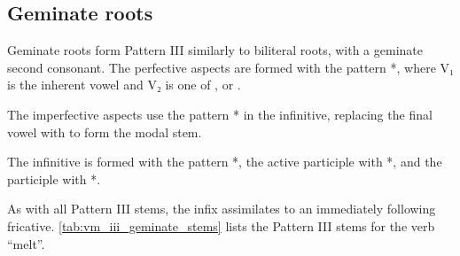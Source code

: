 \documentclass[grammar]{subfiles}
\begin{document}
\subsection{Geminate roots}
\label{ssec:vm_iii_geminate_roots}

Geminate roots form Pattern III similarly to biliteral roots, with a geminate
second consonant.  The perfective aspects are formed with the pattern
*, where V₁ is the inherent vowel and V₂ is one of ,
 or .  

The imperfective aspects use the pattern * in the
infinitive, replacing the final vowel with  to form the modal stem. 

The infinitive is formed with the pattern *, the active participle
with *, and the participle with *.  

As with all Pattern III stems, the infix  assimilates to an immediately
following fricative.  \cref{tab:vm_iii_geminate_stems} lists the Pattern III stems for
the verb  “melt”.

\begin{table}[h!]\small\capstart
  \centering
  \\
  \caption{Pattern III geminate stems \label{tab:vm_iii_geminate_stems}}
\end{table}
\end{document}
